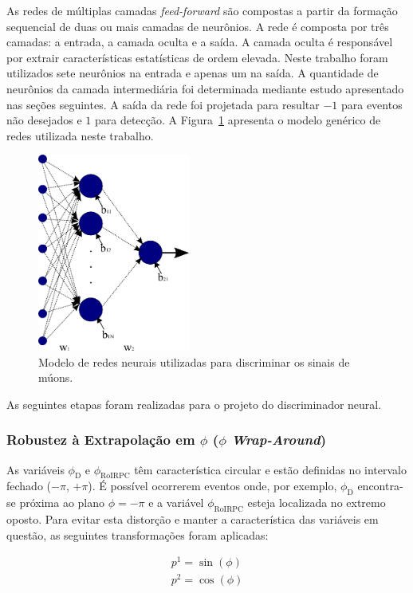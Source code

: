 As redes de múltiplas camadas \emph{feed-forward} são compostas a partir da
formação sequencial de duas ou mais camadas de neurônios. A rede é composta por
três camadas: a entrada, a camada oculta e a saída. A camada oculta é
responsável por extrair características estatísticas de ordem elevada. Neste
trabalho foram utilizados sete neurônios na entrada e apenas um na saída. A
quantidade de neurônios da camada intermediária foi determinada mediante estudo
apresentado nas seções seguintes. A saída da rede foi projetada para resultar
$-1$ para eventos não desejados e $1$ para detecção. A Figura~\ref{fig:nnArch}
apresenta o modelo genérico de redes utilizada neste trabalho.

\begin{figure}[htbp!]
    \centering
    \includegraphics[height=6.5cm]{images/nnschema.png}
    \caption{Modelo de redes neurais utilizadas para discriminar os sinais de
    múons.}
    \label{fig:nnArch}
\end{figure}

As seguintes etapas foram realizadas para o projeto do discriminador neural.

\subsubsection{Robustez à Extrapolação em $\phi$ ($\phi$ \emph{Wrap-Around})}

As variáveis $\phi_\text{D}$ e $\phi_{\text{RoIRPC}}$ têm característica circular
e estão definidas no intervalo fechado ($-\pi$, $+\pi$). É possível ocorrerem
eventos onde, por exemplo, $\phi_\text{D}$ encontra-se próxima ao plano $\phi =
-\pi$ e a variável $\phi_{\text{RoIRPC}}$ esteja localizada no extremo oposto.
Para evitar esta distorção e manter a característica das variáveis em questão,
as seguintes transformações foram aplicadas:

\begin{eqnarray}
p^1 = \sin(\phi)\\
p^2 = \cos(\phi)
\end{eqnarray}

